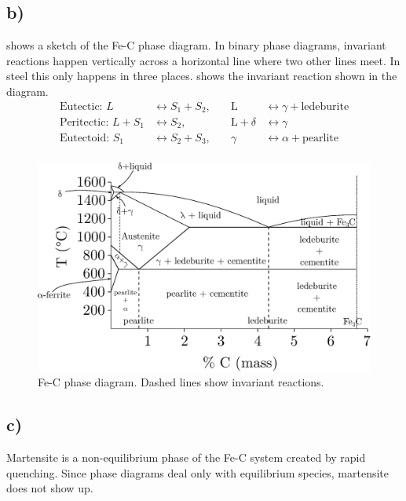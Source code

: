 \documentclass[a4paper]{article}
\begin{document}
	\subsection{b)}
	 shows a sketch of the Fe-C phase diagram. In binary phase diagrams, invariant reactions happen vertically across a horizontal line where two other lines meet. In steel this only happens in three places.  shows the invariant reaction shown in the diagram.
	\begin{subequations}
		\begin{align}
			\textrm{Eutectic: } L &\leftrightarrow S_{1} + S_{2}, \quad &\textrm{L} &\leftrightarrow \gamma + \textrm{ledeburite}\\
			\textrm{Peritectic: } L + S_{1} &\leftrightarrow S_{2}, \quad &\textrm{L} + \delta &\leftrightarrow \gamma\\
			\textrm{Eutectoid: } S_{1} &\leftrightarrow S_{2} + S_{3}, \quad &\gamma &\leftrightarrow \alpha + \textrm{pearlite} \\
		\end{align}\label{e:fecr}
	\end{subequations}
	\begin{figure}
		\centering
		\includegraphics[width=\textwidth]{fecpd.eps}
		\caption{Fe-C phase diagram. Dashed lines show invariant reactions.}
		\label{f:steelpd}
	\end{figure}
	\subsection{c)}
	Martensite is a non-equilibrium phase of the Fe-C system created by rapid quenching. Since phase diagrams deal only with equilibrium species, martensite does not show up.
\end{document}
